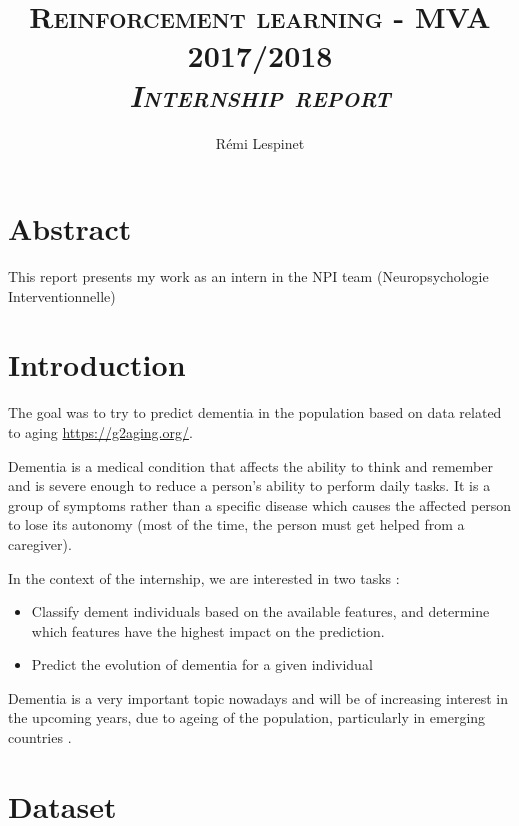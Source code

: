 \documentclass[a4paper, 11pt]{article}
\title{\textsc{Reinforcement learning - MVA 2017/2018 \\ \emph{Internship report}} }
\author{Rémi Lespinet}
\date{}
\begin{document}
\maketitle
\thispagestyle{fancy}


\section{Abstract}

This report presents my work as an intern in the NPI team
(Neuropsychologie Interventionnelle)

\section{Introduction}

The goal was to try to predict dementia in the population based on
data related to aging \url{https://g2aging.org/}.

Dementia is a medical condition that affects the ability to think and
remember and is severe enough to reduce a person's ability to perform
daily tasks. It is a group of symptoms rather than a specific disease
which causes the affected person to lose its autonomy (most of the
time, the person must get helped from a caregiver).

In the context of the internship, we are interested in two tasks :
\begin{itemize}
\item Classify dement individuals based on the available features, and
  determine which features have the highest impact on the prediction.
\item Predict the evolution of dementia for a given individual
\end{itemize}
Dementia is a very important topic nowadays and will be of increasing
interest in the upcoming years, due to ageing of the population,
particularly in emerging countries \cite{?}.

\section{Dataset}
\end{document}
